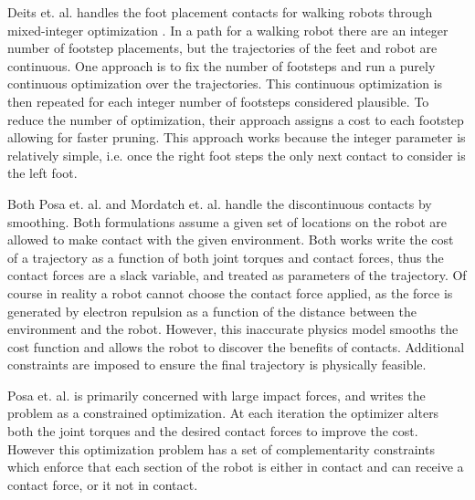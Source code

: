 \documentclass[../thesis.tex]{subfiles}
\begin{document}
Deits et. al. handles the foot placement contacts for walking robots through mixed-integer optimization \cite{Deits2015}.
In a path for a walking robot there are an integer number of footstep placements, but the trajectories of the feet and robot are continuous.
One approach is to fix the number of footsteps and run a purely continuous optimization over the trajectories.
This continuous optimization is then repeated for each integer number of footsteps considered plausible.
To reduce the number of optimization, their approach assigns a cost to each footstep allowing for faster pruning.
This approach works because the integer parameter is relatively simple, i.e. once the right foot steps the only next contact to consider is the left foot.


Both Posa et. al. \cite{Posa2013} and Mordatch et. al. \cite{Mordatch2012}  handle the discontinuous contacts by smoothing.
Both formulations assume a given set of locations on the robot are allowed to make contact with the given environment.
Both works write the cost of a trajectory as a function of both joint torques and contact forces, thus the contact forces are a slack variable, and treated as parameters of the trajectory.
Of course in reality a robot cannot choose the contact force applied, as the force is generated by electron repulsion as a function of the distance between the environment and the robot.
However, this inaccurate physics model smooths the cost function and allows the robot to discover the benefits of contacts.
Additional constraints are imposed to ensure the final trajectory is physically feasible.


Posa et. al. \cite{Posa2013} is primarily concerned with large impact forces, and writes the problem as a constrained optimization.
At each iteration the optimizer alters both the joint torques and the desired contact forces to improve the cost.
However this optimization problem has a set of complementarity constraints which enforce that each section of the robot is either in contact and can receive a contact force, or it not in contact.
\end{document}
